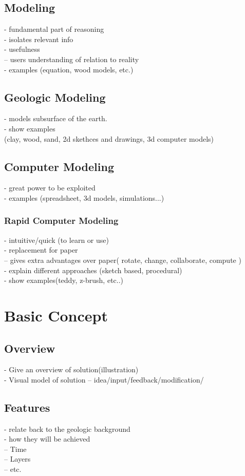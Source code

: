\documentclass[a4paper,10pt]{article}
\begin{document}
\subsection{Modeling}
- fundamental part of reasoning\\
- isolates relevant info\\
- usefulness\\
  -- users understanding of relation to reality\\
- examples (equation, wood models, etc.)

\subsection{Geologic Modeling}
- models subsurface of the earth.\\
- show examples\\(clay, wood, sand, 2d skethces and drawings, 3d computer models)

\subsection{Computer Modeling}
- great power to be exploited\\
- examples (spreadsheet, 3d models, simulations...)\\
\subsubsection{Rapid Computer Modeling}
- intuitive/quick (to learn or use)\\
- replacement for paper\\
  -- gives extra advantages over paper( rotate, change, collaborate, compute )\\
- explain different approaches (sketch based, procedural)\\
- show examples(teddy, z-brush, etc..)\\


\section{Basic Concept}
\subsection{Overview}
- Give an overview of solution(illustration)\\
- Visual model of solution
  -- idea/input/feedback/modification/
\subsection{Features}
- relate back to the geologic background\\
- how they will be achieved\\
   -- Time\\
   -- Layers\\
   -- etc.\\
\end{document}
